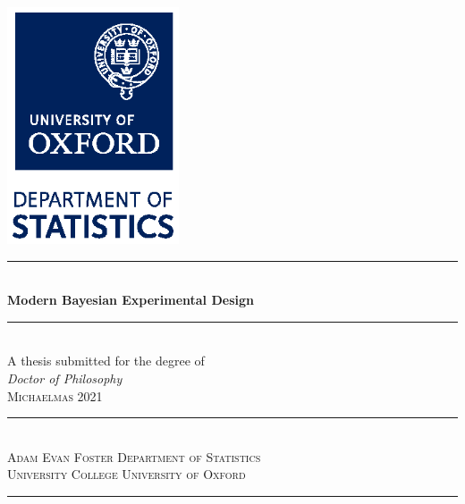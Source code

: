 \documentclass[TRANSFER_THESIS.tex]{subfiles}
\begin{document}
\thispagestyle{empty}
\begin{titlepage}
\begin{center}
\hfill \includegraphics[width=2.0in]{figures/Dept_Stats_logo_vertical_CMYK.eps} \hfill \phantom{.} \\
\vspace{2.5cm}
\rule{\textwidth}{0.5mm} \\ [16pt]
\Huge {\bfseries Modern Bayesian Experimental Design}
\rule{\textwidth}{0.5mm} \\ [4pt]
\vfill
\Large {A thesis submitted for the degree of \\ \emph{Doctor of Philosophy}} \\
\vspace{1cm}
\large \textsc{Michaelmas 2021} \\
\rule{\textwidth}{0.5mm} \\ [4pt]
{\fontsize{14}{14}\textsc{Adam Evan Foster} \hfill \textsc{Department of Statistics}} \\ [8pt]
{\fontsize{14}{14} \textsc{University College \hfill University of Oxford}}
\rule{\textwidth}{0.5mm} \\ [4pt]
\end{center}
\vspace{2cm}
\end{titlepage}
\end{document}
